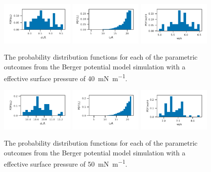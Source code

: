 \documentclass[amsmath,amssymb,superscriptaddress]{revtex4-1}
\begin{document}
%
%
\begin{figure}
 \centering
 \includegraphics[width=0.32\textwidth]{berger_40_dh}
 \includegraphics[width=0.32\textwidth]{berger_40_tt}
 \includegraphics[width=0.32\textwidth]{berger_40_wph}
 \caption{The probability distribution functions for each of the parametric outcomes from the Berger potential model simulation with a effective surface pressure of \SI{40}{\milli\newton\per\meter}.}
 \label{fig:be40}
\end{figure}
%
%
\begin{figure}
 \centering
 \includegraphics[width=0.32\textwidth]{berger_50_dh}
 \includegraphics[width=0.32\textwidth]{berger_50_tt}
 \includegraphics[width=0.32\textwidth]{berger_50_wph}
 \caption{The probability distribution functions for each of the parametric outcomes from the Berger potential model simulation with a effective surface pressure of \SI{50}{\milli\newton\per\meter}.}
 \label{fig:be50}
\end{figure}
\end{document}
